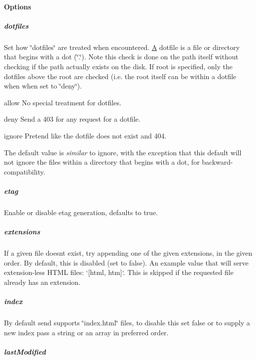 \paragraph*{Options}

\subparagraph*{dotfiles}

Set how \char`\"{}dotfiles\char`\"{} are treated when encountered. \hyperlink{class_a}{A} dotfile is a file or directory that begins with a dot (\char`\"{}.\char`\"{}). Note this check is done on the path itself without checking if the path actually exists on the disk. If {\ttfamily root} is specified, only the dotfiles above the root are checked (i.\+e. the root itself can be within a dotfile when when set to \char`\"{}deny\char`\"{}).


\begin{DoxyItemize}
\item {\ttfamily \textquotesingle{}allow\textquotesingle{}} No special treatment for dotfiles.
\item {\ttfamily \textquotesingle{}deny\textquotesingle{}} Send a 403 for any request for a dotfile.
\item {\ttfamily \textquotesingle{}ignore\textquotesingle{}} Pretend like the dotfile does not exist and 404.
\end{DoxyItemize}

The default value is {\itshape similar} to {\ttfamily \textquotesingle{}ignore\textquotesingle{}}, with the exception that this default will not ignore the files within a directory that begins with a dot, for backward-\/compatibility.

\subparagraph*{etag}

Enable or disable etag generation, defaults to true.

\subparagraph*{extensions}

If a given file doesn\textquotesingle{}t exist, try appending one of the given extensions, in the given order. By default, this is disabled (set to {\ttfamily false}). An example value that will serve extension-\/less H\+T\+M\+L files\+: `\mbox{[}\textquotesingle{}html\textquotesingle{}, \textquotesingle{}htm\textquotesingle{}\mbox{]}`. This is skipped if the requested file already has an extension.

\subparagraph*{index}

By default send supports \char`\"{}index.\+html\char`\"{} files, to disable this set {\ttfamily false} or to supply a new index pass a string or an array in preferred order.

\subparagraph*{last\+Modified}

